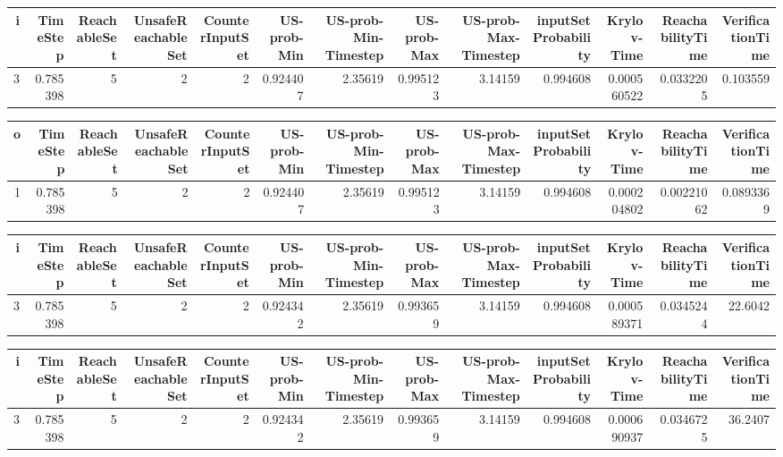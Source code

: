 \begin{tabular}{rrrrrrrrrrrrr}
\hline
   i &   TimeStep &   ReachableSet &   UnsafeReachableSet &   CounterInputSet &   US-prob-Min &   US-prob-Min-Timestep &   US-prob-Max &   US-prob-Max-Timestep &   inputSet Probability &   Krylov-Time &   ReachabilityTime &   VerificationTime \\
\hline
   3 &   0.785398 &              5 &                    2 &                 2 &      0.924407 &                2.35619 &      0.995123 &                3.14159 &               0.994608 &   0.000560522 &          0.0332205 &           0.103559 \\
\hline
\end{tabular}
\begin{tabular}{rrrrrrrrrrrrr}
\hline
   o &   TimeStep &   ReachableSet &   UnsafeReachableSet &   CounterInputSet &   US-prob-Min &   US-prob-Min-Timestep &   US-prob-Max &   US-prob-Max-Timestep &   inputSet Probability &   Krylov-Time &   ReachabilityTime &   VerificationTime \\
\hline
   1 &   0.785398 &              5 &                    2 &                 2 &      0.924407 &                2.35619 &      0.995123 &                3.14159 &               0.994608 &   0.000204802 &         0.00221062 &          0.0893369 \\
\hline
\end{tabular}
\begin{tabular}{rrrrrrrrrrrrr}
\hline
   i &   TimeStep &   ReachableSet &   UnsafeReachableSet &   CounterInputSet &   US-prob-Min &   US-prob-Min-Timestep &   US-prob-Max &   US-prob-Max-Timestep &   inputSet Probability &   Krylov-Time &   ReachabilityTime &   VerificationTime \\
\hline
   3 &   0.785398 &              5 &                    2 &                 2 &      0.924342 &                2.35619 &      0.993659 &                3.14159 &               0.994608 &   0.000589371 &          0.0345244 &            22.6042 \\
\hline
\end{tabular}
\begin{tabular}{rrrrrrrrrrrrr}
\hline
   i &   TimeStep &   ReachableSet &   UnsafeReachableSet &   CounterInputSet &   US-prob-Min &   US-prob-Min-Timestep &   US-prob-Max &   US-prob-Max-Timestep &   inputSet Probability &   Krylov-Time &   ReachabilityTime &   VerificationTime \\
\hline
   3 &   0.785398 &              5 &                    2 &                 2 &      0.924342 &                2.35619 &      0.993659 &                3.14159 &               0.994608 &   0.000690937 &          0.0346725 &            36.2407 \\
\hline
\end{tabular}
